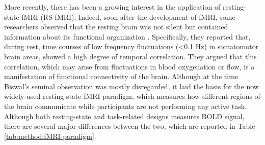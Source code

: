 More recently, there has been a growing interest in the application of resting-state fMRI (RS-fMRI). Indeed, soon after the development of fMRI, some researchers observed that the resting brain was not silent but contained information about its functional organization \citep{biswal_functional_1995}. Specifically, they reported that, during rest, time courses of low frequency fluctuations (<0.1 Hz) in somatomotor brain areas, showed a high degree of temporal correlation. They argued that this correlation, which may arise from fluctuations in blood oxygenation or flow, is a manifestation of functional connectivity of the brain. Although at the time Biswal’s seminal observation was mostly disregarded, it laid the basis for the now widely-used resting-state fMRI paradigm, which measures how different regions of the brain communicate while participants are not performing any active task. Although both resting-state and task-related designs measures BOLD signal, there are several major differences between the two, which are reported in Table \ref{tab:method:fMRI-paradigm}.

